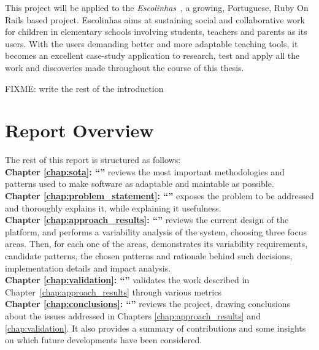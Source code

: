 This project will be applied to the \textit{Escolinhas}~\cite{escolinhas}, a growing, Portuguese, Ruby On Rails based project. Escolinhas aims at sustaining social and collaborative work for children in elementary schools involving students, teachers and parents as its users. With the users demanding better and more adaptable teaching tools, it becomes an excellent case-study application to research, test and apply all the work and discoveries made throughout the course of this thesis.

FIXME: write the rest of the introduction

\section{Report Overview}\label{sec:structure}

The rest of this report is structured as follows:\\

\textbf{Chapter \ref{chap:sota}: ``'' } reviews the most important methodologies and patterns used to make software as adaptable and maintable as possible.\\

\textbf{Chapter \ref{chap:problem_statement}: ``'' } exposes the problem to be addressed and thoroughly explains it, while explaining it usefulness.\\

\textbf{Chapter \ref{chap:approach_results}: ``'' } reviews the current design of the platform, and performs a variability analysis of the system, choosing three focus areas. Then, for each one of the areas, demonstrates its variability requirements, candidate patterns, the chosen patterns and rationale behind such decisions, implementation details and impact analysis.\\

\textbf{Chapter \ref{chap:validation}: ``'' } validates the work described in Chapter~\ref{chap:approach_results} through various metrics\\ %

\textbf{Chapter \ref{chap:conclusions}: ``'' } reviews the project, drawing conclusions about the issues addressed in Chapters \ref{chap:approach_results} and \ref{chap:validation}. It also provides a summary of contributions and some insights on which future developments have been considered.\\

